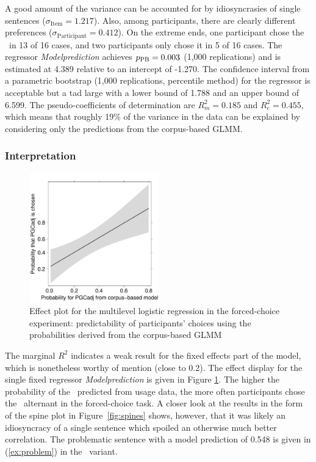 A good amount of the variance can be accounted for by idiosyncrasies of single sentences ($\sigma_{\text{Item}}=1.217$).
Also, among participants, there are clearly different preferences ($\sigma_{\text{Participant}}=0.412$).
On the extreme ends, one participant chose the \PGCa\ in 13 of 16 cases, and two participants only chose it in 5 of 16 cases.
The regressor \textit{Modelprediction} achieves $p_{\text{PB}}=0.003$ (1,000 replications) and is estimated at 4.389 relative to an intercept of -1.270.
The confidence interval from a parametric bootstrap (1,000 replications, percentile method) for the regressor is acceptable but a tad large with a lower bound of 1.788 and an upper bound of 6.599.
The pseudo-coefficients of determination are $R^2_{m}=0.185$ and $R^2_{c}=0.455$, which means that roughly 19\% of the variance in the data can be explained by considering only the predictions from the corpus-based GLMM.

\subsubsection{Interpretation}

\begin{figure}[htbp!]
\centering
\includegraphics[width=0.5\textwidth]{../R/output/fc_effects}
\caption{Effect plot for the multilevel logistic regression in the forced-choice experiment: predictability of participants' choices using the probabilities derived from the corpus-based GLMM}
\label{fig:afc:effects}
\end{figure}

The marginal $R^2$ indicates a weak result for the fixed effects part of the model, which is nonetheless worthy of mention (close to 0.2).
The effect display for the single fixed regressor \textit{Modelprediction} is given in Figure \ref{fig:afc:effects}.
The higher the probability of the \PGCa\ predicted from usage data, the more often participants chose the \PGCa\ alternant in the forced-choice task.
A closer look at the results in the form of the spine plot in Figure~\ref{fig:spines} shows, however, that it was likely an idiosyncracy of a single sentence which spoiled an otherwise much better correlation.
The problematic sentence with a model prediction of 0.548 is given in (\ref{ex:problem}) in the \PGCa\ variant.

